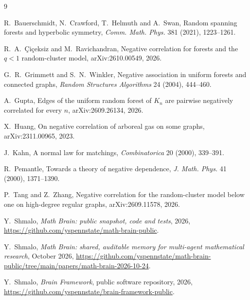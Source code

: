 \documentclass[11pt]{amsart}
\theoremstyle{remark}
\begin{document}
\begin{thebibliography}{9}

R.~Bauerschmidt, N.~Crawford, T.~Helmuth and A.~Swan, Random spanning forests and
hyperbolic symmetry, \emph{Comm. Math. Phys.} 381 (2021), 1223--1261.

R.~A.~\c{C}i\c{c}eksiz and M.~Ravichandran, Negative correlation for forests and the
$q<1$ random-cluster model, arXiv:2610.00549, 2026.

G.~R.~Grimmett and S.~N.~Winkler, Negative association in uniform forests and connected
graphs, \emph{Random Structures Algorithms} 24 (2004), 444--460.

A.~Gupta, Edges of the uniform random forest of $K_n$ are pairwise negatively
correlated for every $n$, arXiv:2609.26134, 2026.

X.~Huang, On negative correlation of arboreal gas on some graphs, arXiv:2311.00965, 2023.

J.~Kahn, A normal law for matchings, \emph{Combinatorica} 20 (2000), 339--391.

R.~Pemantle, Towards a theory of negative dependence, \emph{J. Math. Phys.} 41 (2000),
1371--1390.

P.~Tang and Z.~Zhang, Negative correlation for the random-cluster model below one on
high-degree regular graphs, arXiv:2609.11578, 2026.

 Y.~Shmalo, \emph{Math Brain: public snapshot, code and tests}, 2026, \url{https://github.com/yspennstate/math-brain-public}.

 Y.~Shmalo, \emph{Math Brain: shared, auditable memory for multi-agent mathematical research}, October 2026, \url{https://github.com/yspennstate/math-brain-public/tree/main/papers/math-brain-2026-10-24}.

 Y.~Shmalo, \emph{Brain Framework}, public software repository, 2026, \url{https://github.com/yspennstate/brain-framework-public}.

\end{thebibliography}
\end{document}
